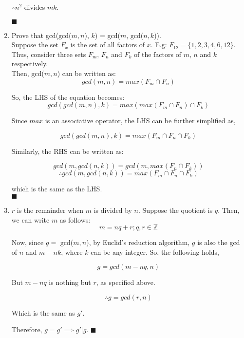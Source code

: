\documentclass[a4paper,12pt]{article} %
\begin{document}
\begin{enumerate}
	$\therefore n^2$ divides $mk$.

	$\blacksquare$

\item Prove that gcd(gcd($m, n$), $k$) = gcd($m$, gcd($n, k$)).\\
	Suppose the set $F_x$ is the set of all factors of $x$. E.g: $F_{12} = \{1, 2, 3, 4, 6, 12\}$.\\
	Thus, consider three sets $F_m$, $F_n$ and $F_k$ of the factors of $m$, $n$ and $k$ respectively.\\
	Then, gcd($m, n$) can be written as:\\
	$$ gcd(m, n) = max(F_m \cap F_n) $$

	So, the LHS of the equation becomes:
	$$ gcd(gcd(m, n), k) = max(max(F_m \cap F_n) \cap F_k) $$

	Since $max$ is an associative operator, the LHS can be further simplified as,

	$$ gcd(gcd(m, n), k) = max(F_m \cap F_n \cap F_k)$$

	Similarly, the RHS can be written as:

	$$ gcd(m, gcd(n, k)) = gcd(m, max(F_n \cap F_k)) $$
	$$ \therefore gcd(m, gcd(n, k)) = max(F_m \cap F_n \cap F_k) $$

	which is the same as the LHS.\\
	$\blacksquare$

\item $r$ is the remainder when $m$ is divided by $n$. Suppose the quotient is $q$. Then, we can write $m$ as follows:
	$$ m = nq + r; q, r \in \mathbb{Z} $$

	Now, since $g = $ gcd($m ,n$), by Euclid's reduction algorithm, $g$ is also the gcd of $n$ and $m - nk$, where $k$ can be any integer. So, the following holds,

	$$ g = gcd(m - nq, n) $$

	But $m - nq$ is nothing but $r$, as specified above.

	$$\therefore g = gcd(r, n)$$

	Which is the same as $g'$.

	Therefore, $g = g' \implies g'|g$. $\blacksquare$

\end{enumerate}
\end{document}
